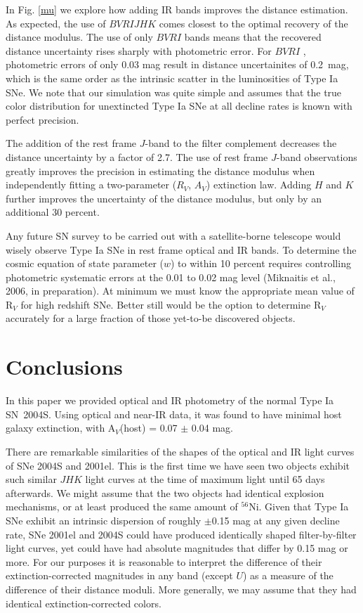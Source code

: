 \documentclass[12pt,preprint,psfig,epsf]{aastex}
\newcommand{\bvri}{\protect\hbox{$BV\!RI$} }
\newcommand{\bvrijhk}{\protect\hbox{$BV\!RIJHK$} }
\begin{document}
In Fig. \ref{mu} we explore how adding IR bands improves the distance 
estimation.  As expected, the use of \bvrijhk comes closest to the 
optimal recovery of the distance modulus. The
use of only \bvri bands means that the recovered distance uncertainty
rises sharply with photometric error. For \bvri, photometric
errors of only 0.03 mag result in distance uncertainites of 0.2~mag,
which is the same order as the intrinsic scatter in the luminosities
of Type Ia SNe.  We note that our simulation was quite simple and assumes  
that the true color distribution for unextincted Type Ia SNe at
all decline rates is known with perfect precision.


The addition of the rest frame $J$-band to the filter complement
decreases the distance uncertainty by a factor of 2.7.
The use of rest frame $J$-band observations greatly improves
the precision in estimating the distance modulus when independently
fitting a two-parameter ($R_V$, $A_V$)
extinction law.  Adding $H$ and $K$ further 
improves the uncertainty of the distance modulus, but only by an 
additional 30 percent. 


Any future SN survey to be carried out with a satellite-borne telescope
would wisely observe Type Ia SNe in rest frame optical and IR bands.  
To determine the cosmic equation of state parameter ($w$) to within 10
percent requires controlling photometric systematic errors at the 0.01
to 0.02 mag level (Miknaitis et al., 2006, in preparation).  At minimum
we must know the appropriate mean value of R$_V$ for high redshift SNe.  
Better still would be the option to determine R$_V$ accurately for a 
large fraction of those yet-to-be discovered objects.

\section{Conclusions} 

In this paper we provided optical and IR photometry of the normal Type Ia
SN~2004S.  Using optical and near-IR data, it was found to have minimal 
host galaxy extinction, with A$_V$(host) = 0.07 $\pm$ 0.04 mag.  

There are remarkable similarities of the shapes of the optical and IR light
curves of SNe 2004S and 2001el.  This is the first time we have seen two objects
exhibit such similar $JHK$ light curves at the time of maximum light until 65 
days afterwards.  We might assume that the two objects had identical explosion
mechanisms, or at least produced the same amount of $^{56}$Ni. Given that Type Ia
SNe exhibit an intrinsic dispersion of roughly $\pm$0.15 mag at any given decline
rate, SNe 2001el and 2004S could have produced identically shaped
filter-by-filter light curves, yet could have had absolute magnitudes that differ
by 0.15 mag or more.  For our purposes it is reasonable to
interpret the difference of their extinction-corrected magnitudes in any band
(except $U$) as a measure of the difference of their distance moduli.  More 
generally, we may assume that they had identical extinction-corrected colors.
\end{document}
